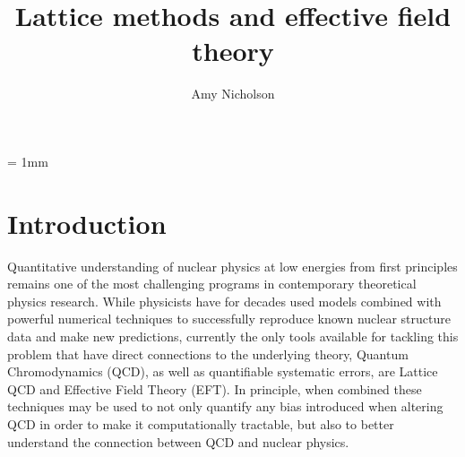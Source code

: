 \newcommand\tautoinfty{\underset{\tau \to\infty}{\longrightarrow}}
\newcommand\Eq[1]{Eq.~(\ref{eq:#1})}
\newcommand\Eqs[2]{Eqs.~(\ref{eq:#1},\ref{eq:#2})}
\newcommand\Fig[1]{Fig.~\ref{fig:#1}}
\newcommand\Figtwo[2]{Figs.~\ref{fig:#1} and \ref{fig:#2}}
\newcommand\Figs[2]{Figs.~\ref{fig:#1}-\ref{fig:#2}}
\newcommand\Sec[1]{Sec.~\ref{sec:#1}}
\newcommand\Sect[1]{Section~\ref{sec:#1}}
\newcommand\Tab[1]{Table~\ref{tab:#1}}
\newcommand\eqn[1]{\label{eq:#1}} 
\newcommand\eq[1]{eq.~(\ref{eq:#1})} 
\newcommand\eqstwo[2]{eqs. (\ref{eq:#1},\ref{eq:#2})} 
\newcommand\eqs[2]{eqs. (\ref{eq:#1}-\ref{eq:#2})} 
%
\title{Lattice methods and effective field theory}
\author{Amy Nicholson}
\maketitle
{}
\unitlength = 1mm


\section{\label{sec:intro}Introduction}
Quantitative understanding of nuclear physics at low energies from first principles remains one of the most challenging programs in contemporary theoretical physics research. While physicists have for decades used models combined with powerful numerical techniques to successfully reproduce known nuclear structure data and make new predictions, currently the only tools available for tackling this problem that have direct connections to the underlying theory, Quantum Chromodynamics (QCD), as well as quantifiable systematic errors, are Lattice QCD and Effective Field Theory (EFT). In principle, when combined these techniques may be used to not only quantify any bias introduced when altering QCD in order to make it computationally tractable, but also to better understand the connection between QCD and nuclear physics.

